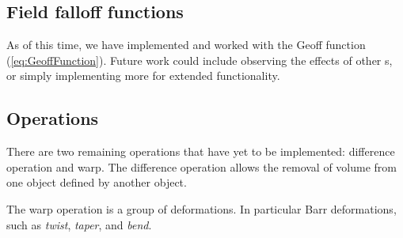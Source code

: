 \documentclass[conference]{acmsiggraph}
\begin{document}
\subsection{Field falloff functions}
As of this time, we have implemented and worked with the Geoff
function (\ref{eq:GeoffFunction}). Future work could include observing the effects
of other \fff s, or simply implementing more for extended functionality.

\subsection{Operations}
There are two remaining operations that have yet to be implemented: difference
operation and warp. The difference operation allows the removal of volume from
one object defined by another object.

The warp operation is a group of deformations. In particular Barr deformations,
such as \textit{twist}, \textit{taper}, and \textit{bend}.



\end{document}
